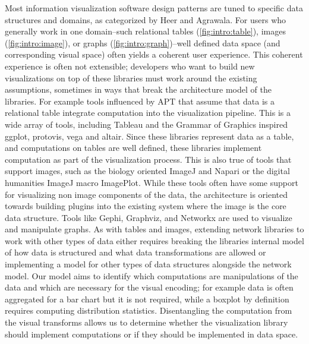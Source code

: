 \documentclass[../main.tex]{subfiles}
\begin{document}
Most information visualization software design patterns are tuned to specific data structures and domains, as categorized by Heer and Agrawala\cite{HeerSoftware2006}. For users who generally work in one domain--such relational tables (\autoref{fig:intro:table}), images (\autoref{fig:intro:image}), or graphs (\autoref{fig:intro:graph})--well defined data space (and corresponding visual space\cite{chiTaxonomyVisualizationTechniques2000}) often yields a coherent user experience\cite{heerDeclarative2010}. This coherent experience is often not extensible; developers who want to build new visualizations on top of these libraries must work around the existing assumptions, sometimes in ways that break the architecture model of the libraries. For example tools influenced by APT that assume that data is a relational table integrate computation into the visualization pipeline. This is a wide array of tools, including Tableau\cite{StoltePolaris2002,hanrahanVizQL2006,MackinlayShowme2007} and the Grammar of Graphics\cite{wilkinsonGrammarGraphics2005} inspired ggplot\cite{wickhamGgplot2ElegantGraphics2016a}, protovis\cite{bostockProtoviz2009}, vega\cite{satyanarayanDeclarativeInteractionDesign2014} and altair\cite{vanderplasAltairInteractiveStatistical2018}. Since these libraries represent data as a table, and computations on tables are well defined\cite{ullmanFirstCourseDatabase2008}, these libraries implement computation as part of the visualization process. This is also true of tools that support images, such as the biology oriented ImageJ\cite{schneiderNIHImageImageJ2012} and  Napari\cite{nicholas_sofroniew_2021_4533308} or the digital humanities ImageJ macro ImagePlot\cite{studiesCulturevisImageplot2021}. While these tools often have some support for visualizing non image components of the data, the architecture is oriented towards building plugins into the existing system \cite{WritingPlugins} where the image is the core data structure. Tools like Gephi\cite{bastianGephiOpenSource2009}, Graphviz\cite{ellsonGraphvizOpenSource2002}, and Networkx\cite{HagbergExploringNetwork2008} are used to  visualize and manipulate graphs. As with tables and images, extending network libraries to work with other types of data either requires breaking the libraries internal model of how data is structured and what data transformations are allowed or implementing a model for other types of data structures alongside the network model. Our model aims to identify which computations are manipulations of the data and which are necessary for the visual encoding; for example data is often aggregated for a bar chart but it is not required, while a boxplot by definition requires computing distribution statistics\cite{wickham40YearsBoxplots2011}. Disentangling the computation from the visual transforms allows us to determine whether the visualization library should implement computations or if they should be implemented in data space. 
\end{document}
